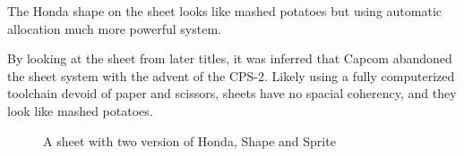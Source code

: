The Honda shape on the sheet looks like mashed potatoes but using automatic allocation much more powerful system.

\begin{trivia}
By looking at the sheet from later titles, it was inferred that Capcom abandoned the sheet system with the advent of the CPS-2. Likely using a fully computerized toolchain devoid of paper and scissors, sheets have no spacial coherency, and they look like mashed potatoes.
\end{trivia}

\begin{figure}[H]
\caption*{A sheet with two version of Honda, Shape and Sprite}
\end{figure}






